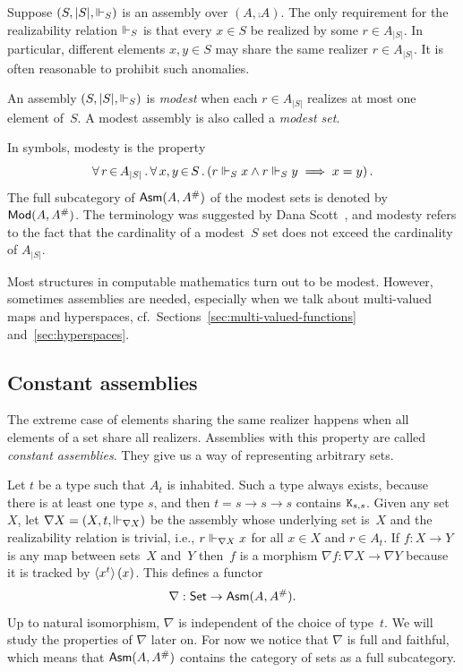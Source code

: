 Suppose $(S, |S|, {\Vdash_S})$ is an assembly over $(A, \comp{A})$. The
only requirement for the realizability relation $\Vdash_S$ is that every
$x \in S$ be realized by some $r \in A_{|S|}$. In particular,
different elements $x, y \in S$ may share the same realizer $r \in
A_{|S|}$. It is often reasonable to prohibit such anomalies.

\begin{definition}
  An assembly $(S, |S|, {\Vdash_S})$ is \emph{modest} when each $r \in
  A_{|S|}$ realizes at most one element of~$S$. A modest assembly is
  also called a \emph{modest set}.
\end{definition}

\noindent
In symbols, modesty is the property
%
\begin{equation*}
  \forall\, r \,{\in}\, A_{|S|}\,.\,
    \forall\, x,y \,{\in}\, S\,.\left(
      r \Vdash_S x \land r \Vdash_S y \implies x = y
    \right)
 .
\end{equation*}
%
The full subcategory of $\mathsf{Asm}(A,A^{\#})$ of the modest sets is
denoted by~$\mathsf{Mod}(A, A^{\#})$. The terminology was suggested by Dana
Scott~\cite{Scott:modest-sets}, and modesty refers to the fact that
the cardinality of a modest~$S$ set does not exceed the cardinality of
$A_{|S|}$.

Most structures in computable mathematics turn out to be modest.
However, sometimes assemblies are needed, especially when we talk
about multi-valued maps and hyperspaces,
cf.~Sections~\ref{sec:multi-valued-functions}
and~\ref{sec:hyperspaces}.


\subsection{Constant assemblies}
\label{sec:nabla}

The extreme case of elements sharing the same realizer happens when
all elements of a set share all realizers. Assemblies with this
property are called \emph{constant assemblies}. They give us a way of
representing arbitrary sets.

Let $t$ be a type such that $A_t$ is inhabited. Such a type always
exists, because there is at least one type $s$, and then $t = s \to s
\to s$ contains $\mathtt{K}_{s,s}$. Given any set $X$, let $\nabla X = (X,
t, {\Vdash_{\nabla X}})$ be the assembly whose underlying set is~$X$ and
the realizability relation is trivial, i.e., $r \Vdash_{\nabla X} x$ for
all $x \in X$ and $r \in A_t$. If $f : X \to Y$ is any map between
sets~$X$ and~$Y$ then~$f$ is a morphism $\nabla f : \nabla X \to
\nabla Y$ because it is tracked by $\langle x^{t} \rangle\,(x)$. This
defines a functor
%
\begin{equation*}
  \nabla : \mathsf{Set} \to \mathsf{Asm}(A,A^{\#}).
\end{equation*}
%
Up to natural isomorphism, $\nabla$ is independent of the choice of
type~$t$. We will study the properties of $\nabla$ later on. For now
we notice that $\nabla$ is full and faithful, which means that
$\mathsf{Asm}(A,A^{\#})$ contains the category of sets as a full
subcategory.

